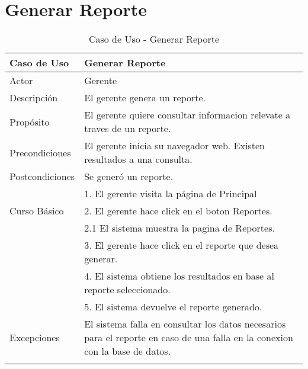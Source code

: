 \section{Generar Reporte}
\begin{longtable}{@{} p{3cm} p{10cm} @{}} \toprule
    \textbf{Caso de Uso}    & Generar Reporte \\ \midrule
    Actor                   & Gerente \\ \cmidrule{1-2}
    Descripción             & El gerente genera un reporte.\\ \cmidrule{1-2}
    Propósito               & El gerente quiere consultar informacion relevate a traves de un reporte. \\ \cmidrule{1-2}
    Precondiciones          & El gerente inicia su navegador web. Existen resultados a una consulta. \\ \cmidrule{1-2} 
    Postcondiciones         & Se generó un reporte. \\ \cmidrule{1-2} 
                            & 1. El gerente visita la página de Principal \\ 
    Curso Básico            & 2. El gerente hace click en el boton Reportes. \\
                            & 2.1 El sistema muestra la pagina de Reportes. \\
                            & 3. El gerente hace click en el reporte que desea generar. \\
                            & 4. El sistema obtiene los resultados en base al reporte seleccionado. \\
                            & 5. El sistema devuelve el reporte generado. \\ \cmidrule{1-2}
    Excepciones             & El sistema falla en consultar los datos necesarios para el reporte en caso de una falla en la conexion con la base de datos.\\ \bottomrule
   \caption{Caso de Uso - Generar Reporte} \label{tab:tabcu-coin}  \\
   \end{longtable}

